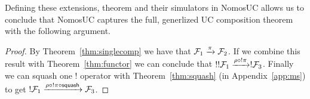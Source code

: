 Defining these extensions, theorem and their simulators in NomosUC allows us to conclude that NomosUC captures the full, generlized UC composition theorem with the following argument. 

\begin{proof}
By Theorem~\ref{thm:singlecomp} we have that $\mathcal{F}_1 \xrightarrow{\pi} \mathcal{F}_2$. If we combine this result with Theorem~\ref{thm:functor} we can conclude that $!!\mathcal{F}_1 \xrightarrow{\rho \circ !\pi} !\mathcal{F}_3$. 
Finally we can squash one $!$ operator with Theorem~\ref{thm:squash} (in Appendix~\ref{app:ms}) to get $!\mathcal{F}_1 \xrightarrow{\rho \circ !\pi \circ \mathsf{squash}} \mathcal{F}_3$.
\end{proof}


